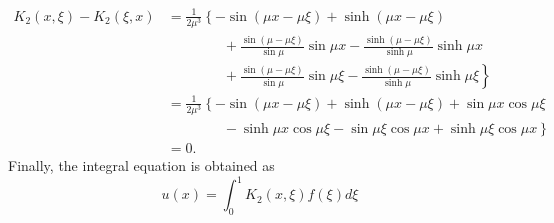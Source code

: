 \begin{enumerate}[(i)]
{    \begin{equation}
    \begin{aligned}
        K_2(x, \xi) - K_2(\xi, x) &= \frac{1}{2\mu^3} \left\{-\sin(\mu x - \mu\xi) + \sinh(\mu x-\mu \xi) \right. \\
        &\qquad \qquad + \left.\frac{\sin(\mu-\mu\xi)}{\sin\mu}\sin\mu x - \frac{\sinh(\mu-\mu\xi)}{\sinh\mu}\sinh\mu x \right.\\
        &\qquad \qquad + \left.\frac{\sin(\mu-\mu\xi)}{\sin\mu}\sin\mu\xi - \frac{\sinh(\mu-\mu\xi)}{\sinh\mu}\sinh\mu\xi  \right\} \\
        &= \frac{1}{2\mu^3} \left\{-\sin(\mu x - \mu\xi) + \sinh(\mu x-\mu \xi) + \sin\mu x \cos\mu \xi \right. \\
        &\qquad \qquad - \left.\sinh\mu x \cos\mu\xi - \sin\mu\xi \cos\mu x + \sinh\mu\xi \cos\mu x \right\}\\
        &= 0.
    \end{aligned}
    \end{equation}
    Finally, the integral equation is obtained as 
    \begin{equation}
        u(x) = \int_0^1 K_2(x, \xi) f(\xi) d\xi
    \end{equation}
}
\end{enumerate}



